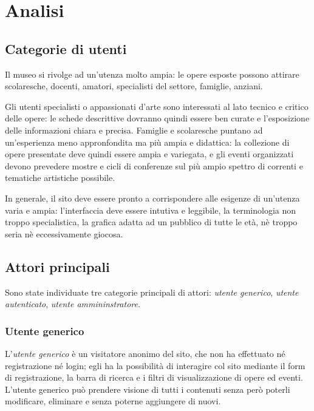 \section{Analisi}
\label{analisi}

\subsection{Categorie di utenti}
\label{analisi-categorie-utenti}
Il museo si rivolge ad un'utenza molto ampia: le opere esposte possono attirare scolaresche, docenti, amatori, specialisti del settore, famiglie, anziani.

Gli utenti specialisti o appassionati d'arte sono interessati al lato tecnico e critico delle opere: le schede descrittive dovranno quindi essere ben curate e l'esposizione delle informazioni chiara e precisa. Famiglie e scolaresche puntano ad un'esperienza meno appronfondita ma più ampia e didattica: la collezione di opere presentate deve quindi essere ampia e variegata, e gli eventi organizzati devono prevedere mostre e cicli di conferenze sul più ampio spettro di correnti e tematiche artistiche possibile.

In generale, il sito deve essere pronto a corrispondere alle esigenze di un'utenza varia e ampia: l'interfaccia deve essere intutiva e leggibile, la terminologia non troppo specialistica, la grafica adatta ad un pubblico di tutte le età, nè troppo seria nè eccessivamente giocosa.

\subsection{Attori principali}
\label{analisi-casi-uso-attori-principali}
Sono state individuate tre categorie principali di attori: \textit{utente generico}, \textit{utente autenticato}, \textit{utente ammininstratore}.

\subsubsection{Utente generico}
\label{analisi-casi-uso-attori-principali-utente-generico}
L'\textit{utente generico} è un visitatore anonimo del sito, che non ha effettuato né registrazione né login; egli ha la possibilità di interagire col sito mediante il form di registrazione, la barra di ricerca e i filtri di visualizzazione di opere ed eventi. L'utente generico può prendere visione di tutti i contenuti senza però poterli modificare, eliminare e senza poterne aggiungere di nuovi.

